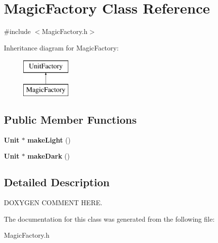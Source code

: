 \section{Magic\+Factory Class Reference}
\label{class_magic_factory}


{\ttfamily \#include $<$Magic\+Factory.\+h$>$}

Inheritance diagram for Magic\+Factory\+:\begin{figure}[H]
\begin{center}
\leavevmode
\includegraphics[height=2.000000cm]{class_magic_factory}
\end{center}
\end{figure}
\subsection*{Public Member Functions}
\begin{DoxyCompactItemize}
\item 
{\bf Unit} $\ast$ {\bfseries make\+Light} ()\label{class_magic_factory_a2f1ef4ca86f4856a2fcc77bfe4b4a19e}

\item 
{\bf Unit} $\ast$ {\bfseries make\+Dark} ()\label{class_magic_factory_aeff3d4611a7da2251a18038da21b5b2c}

\end{DoxyCompactItemize}


\subsection{Detailed Description}
D\+O\+X\+Y\+G\+E\+N C\+O\+M\+M\+E\+N\+T H\+E\+R\+E. 

The documentation for this class was generated from the following file\+:\begin{DoxyCompactItemize}
\item 
Magic\+Factory.\+h\end{DoxyCompactItemize}
